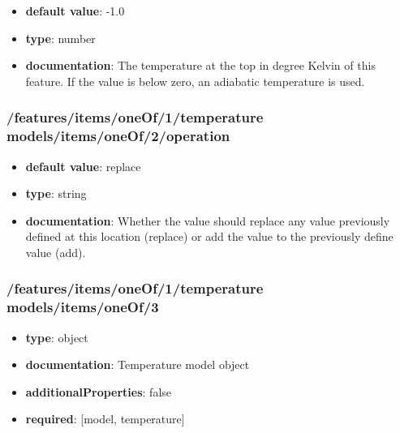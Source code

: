 \begin{itemize}\item {\bf default value}: -1.0
\item {\bf type}: number
\item {\bf documentation}: The temperature at the top in degree Kelvin of this feature. If the value is below zero, an adiabatic temperature is used.
\end{itemize}\subsubsection{/features/items/oneOf/1/temperature models/items/oneOf/2/operation}
\begin{itemize}\item {\bf default value}: replace
\item {\bf type}: string
\item {\bf documentation}: Whether the value should replace any value previously defined at this location (replace) or add the value to the previously define value (add).
\end{itemize}\subsubsection{/features/items/oneOf/1/temperature models/items/oneOf/3}
\begin{itemize}\item {\bf type}: object
\item {\bf documentation}: Temperature model object
\item {\bf additionalProperties}: false
\item {\bf required}: [model, temperature]\end{itemize}
